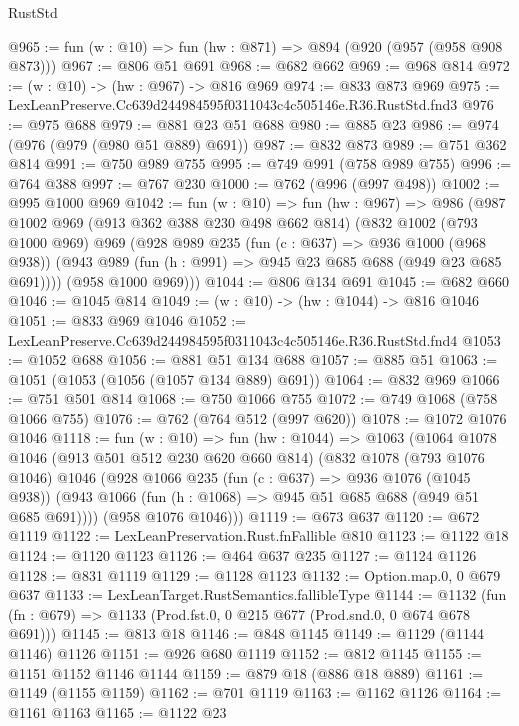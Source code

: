 \begin{lexlean}{RustStd}
\begin{coremodule}
@965 := fun (w : @10) => fun (hw : @871) => @894 (@920 (@957 (@958 @908 @873)))
@967 := @806 @51 @691
@968 := @682 @662
@969 := @968 @814
@972 := (w : @10) -> (hw : @967) -> @816 @969
@974 := @833 @873 @969
@975 := LexLeanPreserve.Cc639d244984595f0311043c4c505146e.R36.RustStd.fnd3
@976 := @975 @688
@979 := @881 @23 @51 @688
@980 := @885 @23
@986 := @974 (@976 (@979 (@980 @51 @889) @691))
@987 := @832 @873
@989 := @751 @362 @814
@991 := @750 @989 @755
@995 := @749 @991 (@758 @989 @755)
@996 := @764 @388
@997 := @767 @230
@1000 := @762 (@996 (@997 @498))
@1002 := @995 @1000 @969
@1042 := fun (w : @10) =>
  fun (hw : @967) =>
  @986
    (@987
      @1002
      @969
      (@913 @362 @388 @230 @498 @662 @814)
      (@832
        @1002
        (@793 @1000 @969)
        @969
        (@928
          @989
          @235
          (fun (c : @637) => @936 @1000 (@968 @938))
          (@943 @989 (fun (h : @991) => @945 @23 @685 @688 (@949 @23 @685 @691))))
        (@958 @1000 @969)))
@1044 := @806 @134 @691
@1045 := @682 @660
@1046 := @1045 @814
@1049 := (w : @10) -> (hw : @1044) -> @816 @1046
@1051 := @833 @969 @1046
@1052 := LexLeanPreserve.Cc639d244984595f0311043c4c505146e.R36.RustStd.fnd4
@1053 := @1052 @688
@1056 := @881 @51 @134 @688
@1057 := @885 @51
@1063 := @1051 (@1053 (@1056 (@1057 @134 @889) @691))
@1064 := @832 @969
@1066 := @751 @501 @814
@1068 := @750 @1066 @755
@1072 := @749 @1068 (@758 @1066 @755)
@1076 := @762 (@764 @512 (@997 @620))
@1078 := @1072 @1076 @1046
@1118 := fun (w : @10) =>
  fun (hw : @1044) =>
  @1063
    (@1064
      @1078
      @1046
      (@913 @501 @512 @230 @620 @660 @814)
      (@832
        @1078
        (@793 @1076 @1046)
        @1046
        (@928
          @1066
          @235
          (fun (c : @637) => @936 @1076 (@1045 @938))
          (@943 @1066 (fun (h : @1068) => @945 @51 @685 @688 (@949 @51 @685 @691))))
        (@958 @1076 @1046)))
@1119 := @673 @637
@1120 := @672 @1119
@1122 := LexLeanPreservation.Rust.fnFallible @810
@1123 := @1122 @18
@1124 := @1120 @1123
@1126 := @464 @637 @235
@1127 := @1124 @1126
@1128 := @831 @1119
@1129 := @1128 @1123
@1132 := Option.map.{0, 0} @679 @637
@1133 := LexLeanTarget.RustSemantics.fallibleType
@1144 := @1132
    (fun (fn : @679) => @1133 (Prod.fst.{0, 0} @215 @677 (Prod.snd.{0, 0} @674 @678 @691)))
@1145 := @813 @18
@1146 := @848 @1145
@1149 := @1129 (@1144 @1146) @1126
@1151 := @926 @680 @1119
@1152 := @812 @1145
@1155 := @1151 @1152 @1146 @1144
@1159 := @879 @18 (@886 @18 @889)
@1161 := @1149 (@1155 @1159)
@1162 := @701 @1119
@1163 := @1162 @1126
@1164 := @1161 @1163
@1165 := @1122 @23

\end{coremodule}
\end{lexlean}
